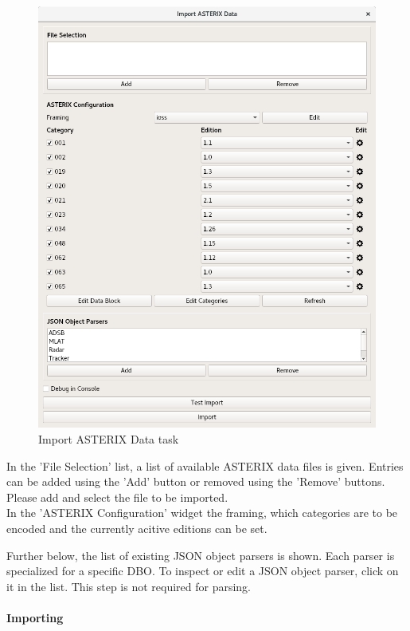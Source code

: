 {\begin{figure}[H]
  \center
    \includegraphics[width=14cm,frame]{../screenshots/asterix_import_data.png}
  \caption{Import ASTERIX Data task}
\end{figure}

In the 'File Selection' list, a list of available ASTERIX data files is given. Entries can be added using the 'Add' button or removed using the 'Remove' buttons. Please add and select the file to be imported.\\

In the 'ASTERIX Configuration' widget the framing, which categories are to be encoded and the currently acitive editions can be set.

Further below, the list of existing JSON object parsers is shown. Each parser is specialized for a specific DBO. To inspect or edit a JSON object parser, click on it in the list. This step is not required for parsing.

\paragraph{Importing}

}
